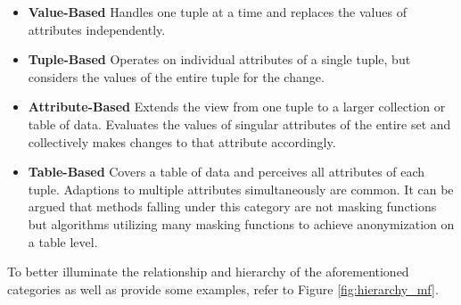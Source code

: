 \begin{itemize}
    \item \textbf{Value-Based} Handles one tuple at a time and replaces the values of attributes independently. 
    \item \textbf{Tuple-Based} Operates on individual attributes of a single tuple, but considers the values of the entire tuple for the change. 
    \item \textbf{Attribute-Based} Extends the view from one tuple to a larger collection or table of data. Evaluates the values of singular attributes of the entire set and collectively makes changes to that attribute accordingly. 
    \item \textbf{Table-Based} Covers a table of data and perceives all attributes of each tuple. Adaptions to multiple attributes simultaneously are common. It can be argued that methods falling under this category are not masking functions but algorithms utilizing many masking functions to achieve anonymization on a table level.  
\end{itemize}

To better illuminate the relationship and hierarchy of the aforementioned categories as well as provide some examples, refer to Figure \ref{fig:hierarchy_mf}. 

